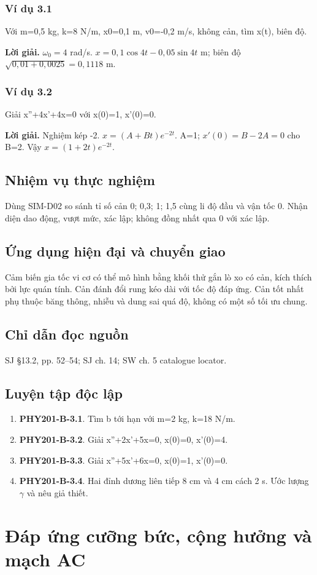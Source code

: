\documentclass[11pt,a4paper,openany]{book}
\begin{document}
\subsection*{Ví dụ 3.1}
Với m=0,5 kg, k=8 N/m, x0=0,1 m, v0=-0,2 m/s, không cản, tìm x(t), biên độ.

\textbf{Lời giải.} $\omega_0=4$ rad/s. $x=0{,}1\cos4t-0{,}05\sin4t$ m; biên độ $\sqrt{0{,}01+0{,}0025}=0{,}1118$ m.
\subsection*{Ví dụ 3.2}
Giải x''+4x'+4x=0 với x(0)=1, x'(0)=0.

\textbf{Lời giải.} Nghiệm kép -2. $x=(A+Bt)e^{-2t}$. A=1; $x'(0)=B-2A=0$ cho B=2. Vậy $x=(1+2t)e^{-2t}$.
\section{Nhiệm vụ thực nghiệm}
Dùng SIM-D02 so sánh tỉ số cản 0; 0,3; 1; 1,5 cùng li độ đầu và vận tốc 0. Nhận diện dao động, vượt mức, xác lập; không đồng nhất qua 0 với xác lập.
\section{Ứng dụng hiện đại và chuyển giao}
Cảm biến gia tốc vi cơ có thể mô hình bằng khối thử gắn lò xo có cản, kích thích bởi lực quán tính. Cản đánh đổi rung kéo dài với tốc độ đáp ứng. Cản tốt nhất phụ thuộc băng thông, nhiễu và dung sai quá độ, không có một số tối ưu chung.
\section{Chỉ dẫn đọc nguồn}
SJ §13.2, pp. 52–54; SJ ch. 14; SW ch. 5 catalogue locator.
\section{Luyện tập độc lập}
\begin{enumerate}
\item \textbf{PHY201-B-3.1}. Tìm b tới hạn với m=2 kg, k=18 N/m.
\item \textbf{PHY201-B-3.2}. Giải x''+2x'+5x=0, x(0)=0, x'(0)=4.
\item \textbf{PHY201-B-3.3}. Giải x''+5x'+6x=0, x(0)=1, x'(0)=0.
\item \textbf{PHY201-B-3.4}. Hai đỉnh dương liên tiếp 8 cm và 4 cm cách 2 s. Ước lượng \ensuremath{\gamma} và nêu giả thiết.
\end{enumerate}
\chapter{Đáp ứng cưỡng bức, cộng hưởng và mạch AC}
\end{document}
